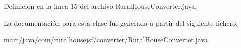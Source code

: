 Definición en la línea 15 del archivo Rural\+House\+Converter.\+java.



La documentación para esta clase fue generada a partir del siguiente fichero\+:\begin{DoxyCompactItemize}
\item 
main/java/com/ruralhousejsf/converter/\mbox{\hyperlink{a00011}{Rural\+House\+Converter.\+java}}\end{DoxyCompactItemize}

